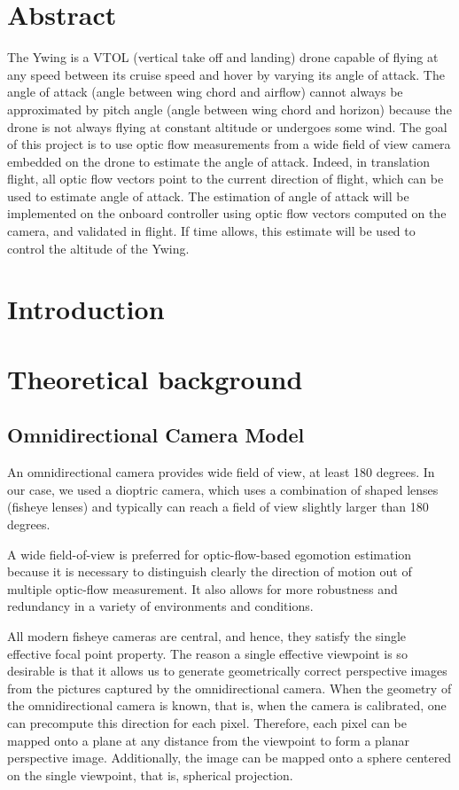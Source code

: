 \section*{Abstract}
The Ywing is a VTOL (vertical take off and landing) drone capable of flying at any speed between its cruise speed and hover by varying its angle of attack. The angle of attack (angle between wing chord and airflow) cannot always be approximated by pitch angle (angle between wing chord and horizon) because the drone is not always flying at constant altitude or undergoes some wind. The goal of this project is to use optic flow measurements from a wide field of view camera embedded on the drone to estimate the angle of attack. Indeed, in translation flight, all optic flow vectors point to the current direction of flight, which can be used to estimate angle of attack. The estimation of angle of attack will be implemented on the onboard controller using optic flow vectors computed on the camera, and validated in flight. If time allows, this estimate will be used to control the altitude of the Ywing.

\section{Introduction}

\section{Theoretical background}	

\subsection{Omnidirectional Camera Model}
An omnidirectional camera provides wide field of view, at least 180 degrees. In our case, we used a dioptric camera, which uses a combination of shaped lenses (fisheye lenses) and typically can reach a field of view slightly larger than 180 degrees. 

A wide field-of-view is preferred for optic-flow-based egomotion estimation because it is necessary to distinguish clearly the direction of motion out of multiple optic-flow measurement. It also allows for more robustness and redundancy in a variety of environments and conditions.

All modern fisheye cameras are central, and hence, they satisfy the single effective focal point property. The reason a single effective viewpoint is so desirable is that it allows us to generate geometrically correct perspective images from the pictures captured by the omnidirectional camera. When the geometry of the omnidirectional camera is known, that is, when the camera is calibrated, one can precompute this direction for each pixel. Therefore, each pixel can be mapped onto a plane at any distance from the viewpoint to form a planar perspective image. Additionally, the image can be mapped onto a sphere centered on the single viewpoint, that is, spherical projection.

